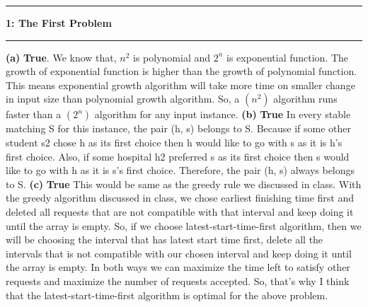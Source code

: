 \documentclass[11pt]{article}
\newcommand\question[2]{\vspace{.25in}\hrule\textbf{#1: #2}\vspace{.5em}\hrule\vspace{.10in}}
\renewcommand\part[1]{\vspace{.10in}\textbf{(#1)}}
\begin{document}
\newcommand\NAME{Abrar Islam}  %
\newcommand\ID{abrarr18}     %
\newcommand\HWNUM{}              %
\question{1}{The First Problem}
\part{a} \textbf{True}. 
\newline 
We know that, $n^2$ is polynomial and $2^n$ is exponential function. The growth of exponential function is higher than the growth of polynomial function. This means exponential growth algorithm will take more time on smaller change in input size than polynomial growth algorithm. So, a \Theta$(n^2)$ algorithm runs faster than a \Theta$(2^n)$ algorithm for any input instance.
\newline
\newline 
\part{b} \textbf{True}
\newline 
In every stable matching S for this instance, the pair (h, s) belongs to S. Because if some other student s2 chose h as its first choice then h would like to go with s as it is h's first choice. Also, if some hospital h2 preferred s as its first choice then s would like to go with h as it is s's first choice. Therefore, the pair (h, s) always belongs to S.
\newline
\newline 
\part{c} \textbf{True}
\newline
This would be same as the greedy rule we discussed in class. With the greedy algorithm discussed in class, we chose earliest finishing time first and deleted all requests that are not compatible with that interval and keep doing it until the array is empty. So, if we choose latest-start-time-first algorithm, then we will be choosing the interval that has latest start time first, delete all the intervals that is not compatible with our chosen interval and keep doing it until the array is empty. In both ways we can maximize the time left to satisfy other requests and maximize the number of requests accepted. So, that's why I think that the latest-start-time-first algorithm is optimal for the above problem. 
\newline 
\newline
\end{document}
